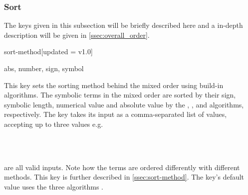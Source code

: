 	\subsubsection*{Sort}
	The keys given in this subsection will be briefly described here and a in-depth description will be given in \cref{ssec:overall_order}.
	
	\begin{option}{sort-method}[updated = v1.0]
		\begin{values}[default = {sign, symbol, abs}]
			abs, number, sign, symbol
		\end{values}
		This key sets the sorting method behind the mixed order using build-in algorithms. The symbolic terms in the mixed order are sorted by their sign, symbolic length, numerical value and absolute value by the , ,  and  algorithms, respectively. The key takes its input as a comma-separated list of values, accepting up to three values e.g.
		
		\begin{example}
			 \\
			 \\
		\end{example}
		
		\noindent are all valid inputs. Note how the terms are ordered differently with different methods. This key is further described in \cref{ssec:sort-method}. The key's default value uses the three algorithms .
	\end{option}
	

